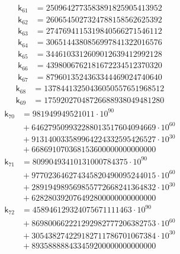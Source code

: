 \[
\begin{aligned}
\mathsf{k}_{61} &={} 2509642773583891825905413952
\end{aligned}
\]
\[
\begin{aligned}
\mathsf{k}_{62} &={} 2606545027324788158562625392
\end{aligned}
\]
\[
\begin{aligned}
\mathsf{k}_{63} &={} 2747694115319840566271546112
\end{aligned}
\]
\[
\begin{aligned}
\mathsf{k}_{64} &={} 3065144380856997841322016576
\end{aligned}
\]
\[
\begin{aligned}
\mathsf{k}_{65} &={} 3446103312609012639412992128
\end{aligned}
\]
\[
\begin{aligned}
\mathsf{k}_{66} &={} 4398006762181672234512370320
\end{aligned}
\]
\[
\begin{aligned}
\mathsf{k}_{67} &={} 8796013524363344469024740640
\end{aligned}
\]
\[
\begin{aligned}
\mathsf{k}_{68} &={} 13784413250436050557651968512
\end{aligned}
\]
\[
\begin{aligned}
\mathsf{k}_{69} &={} 17592027048726688938049481280
\end{aligned}
\]
\[
\begin{aligned}
\mathsf{k}_{70} &={} 981949949521011\cdot 10^{90}\\
&{}+ 646279509932288013517604094669\cdot 10^{60}\\
&{}+ 913140033589964224332595426527\cdot 10^{30}\\
&{}+ 668691070368153600000000000000
\end{aligned}
\]
\[
\begin{aligned}
\mathsf{k}_{71} &={} 80990493410131000784375\cdot 10^{90}\\
&{}+ 977023646274345820490095244015\cdot 10^{60}\\
&{}+ 289194989569855772668241364832\cdot 10^{30}\\
&{}+ 628280392076492800000000000000
\end{aligned}
\]
\[
\begin{aligned}
\mathsf{k}_{72} &={} 458946129324075671111463\cdot 10^{90}\\
&{}+ 869800662221292982777206382753\cdot 10^{60}\\
&{}+ 305438274229182711786701067384\cdot 10^{30}\\
&{}+ 893588888433459200000000000000
\end{aligned}
\]
